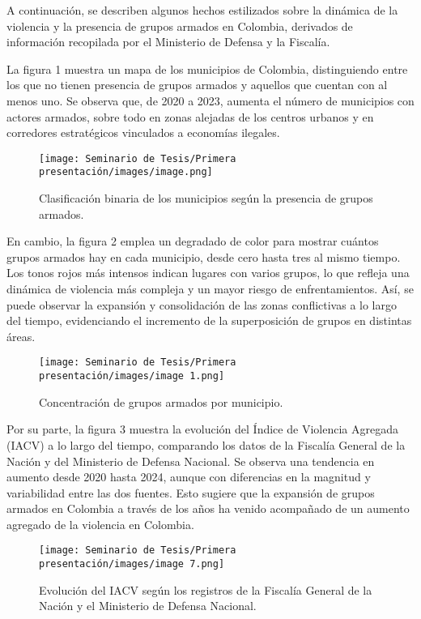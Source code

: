 
A continuación, se describen algunos hechos estilizados sobre la dinámica de la violencia y la presencia de grupos armados en Colombia, derivados de información recopilada por el Ministerio de Defensa y la Fiscalía.

La figura 1 muestra un mapa de los municipios de Colombia, distinguiendo entre los que no tienen presencia de grupos armados y aquellos que cuentan con al menos uno. Se observa que, de 2020 a 2023, aumenta el número de municipios con actores armados, sobre todo en zonas alejadas de los centros urbanos y en corredores estratégicos vinculados a economías ilegales.

\begin{figure}[h!]
    \centering
    \texttt{[image: Seminario de Tesis/Primera presentación/images/image.png]}
    \caption{Clasificación binaria de los municipios según la presencia de grupos armados.}
    \label{fig:graph1}
\end{figure}

En cambio, la figura 2 emplea un degradado de color para mostrar cuántos grupos armados hay en cada municipio, desde cero hasta tres al mismo tiempo. Los tonos rojos más intensos indican lugares con varios grupos, lo que refleja una dinámica de violencia más compleja y un mayor riesgo de enfrentamientos. Así, se puede observar la expansión y consolidación de las zonas conflictivas a lo largo del tiempo, evidenciando el incremento de la superposición de grupos en distintas áreas.

\begin{figure}[h!]
    \centering
    \texttt{[image: Seminario de Tesis/Primera presentación/images/image 1.png]}
    \caption{Concentración de grupos armados por municipio.}
    \label{fig:graph2}
\end{figure}

Por su parte, la figura 3 muestra la evolución del Índice de Violencia Agregada (IACV) a lo largo del tiempo, comparando los datos de la Fiscalía General de la Nación y del Ministerio de Defensa Nacional. Se observa una tendencia en aumento desde 2020 hasta 2024, aunque con diferencias en la magnitud y variabilidad entre las dos fuentes. Esto sugiere que la expansión de grupos armados en Colombia a través de los años ha venido acompañado de un aumento agregado de la violencia en Colombia.

\begin{figure}[h!]
    \centering
    \texttt{[image: Seminario de Tesis/Primera presentación/images/image 7.png]}
    \caption{Evolución del IACV según los registros de la Fiscalía General de la Nación y el Ministerio de Defensa Nacional.}
    \label{fig:graph3}
\end{figure}

